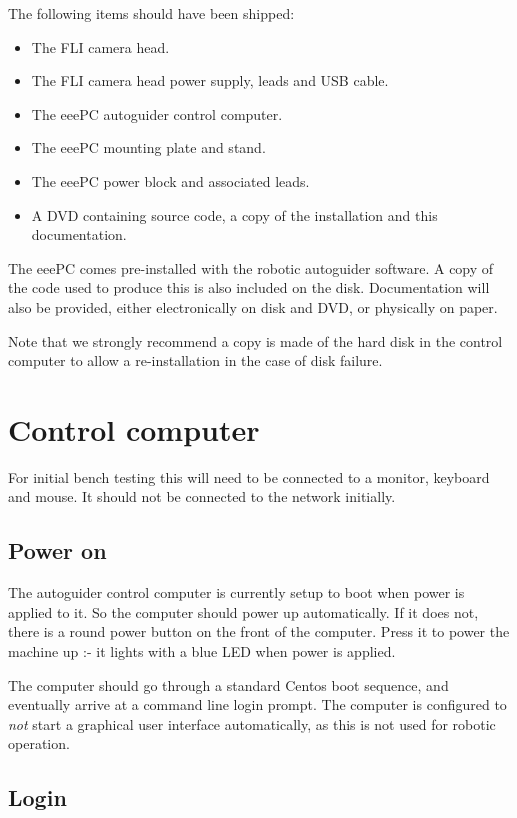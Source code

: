 \documentclass[10pt,a4paper]{article}
\begin{document}
The following items should have been shipped:

\begin{itemize}
\item The FLI camera head.
\item The FLI camera head power supply, leads and USB cable.
\item The eeePC autoguider control computer.
\item The eeePC mounting plate and stand.
\item The eeePC power block and associated leads.
\item A DVD containing source code, a copy of the installation and
this documentation.
\end{itemize}

The eeePC comes pre-installed with the robotic autoguider software. A copy of the
code used to produce this is also included on the disk. Documentation will also be provided, either
electronically on disk and DVD, or physically on paper.

Note that we strongly recommend a copy is made of the hard disk in the
control computer to allow a re-installation in the case of disk failure.

\section{Control computer}

For initial bench testing this will need to be connected to a monitor, keyboard and mouse. It should not be connected to the network initially.

\subsection{Power on}

The autoguider control computer is currently setup to boot when power is applied to it. So the computer should power up automatically. If it does not, there is a round power button on the front of the computer. Press it to power the machine up :- it lights with a blue LED when power is applied.

The computer should go through a standard Centos boot sequence, and eventually arrive at a command line login prompt. The computer is configured to {\em not} start a graphical user interface automatically, as this is not used for robotic operation.

\subsection{Login}
\end{document}
